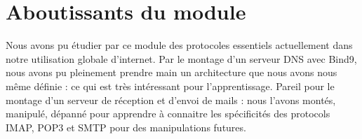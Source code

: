 \section{Aboutissants du module}

Nous avons pu étudier par ce module des protocoles essentiels actuellement dans notre utilisation globale d'internet. Par le montage d'un serveur DNS avec Bind9, nous avons pu pleinement prendre main un architecture que nous avons nous même définie : ce qui est très intéressant pour l'apprentissage. Pareil pour le montage d'un serveur de réception et d'envoi de mails : nous l'avons montés, manipulé, dépanné pour apprendre à connaitre les spécificités des protocols IMAP, POP3 et SMTP pour des manipulations futures.